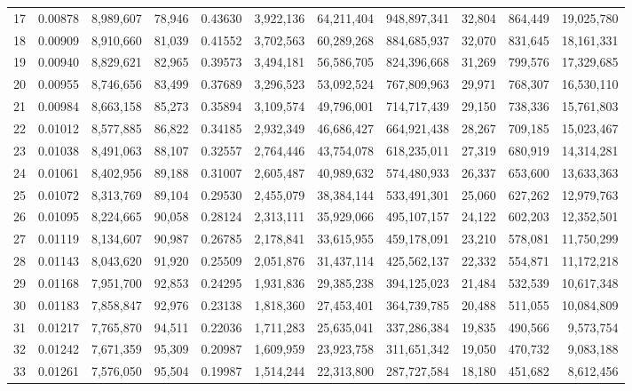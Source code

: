 \begin{landscape}
\begin{longtable}{rrrrrrrrrrr}
17 & 0.00878 & 8,989,607 & 78,946 & 0.43630 & 3,922,136 & 64,211,404 & 948,897,341 & 32,804 & 864,449 & 19,025,780 \\
18 & 0.00909 & 8,910,660 & 81,039 & 0.41552 & 3,702,563 & 60,289,268 & 884,685,937 & 32,070 & 831,645 & 18,161,331 \\
19 & 0.00940 & 8,829,621 & 82,965 & 0.39573 & 3,494,181 & 56,586,705 & 824,396,668 & 31,269 & 799,576 & 17,329,685 \\
20 & 0.00955 & 8,746,656 & 83,499 & 0.37689 & 3,296,523 & 53,092,524 & 767,809,963 & 29,971 & 768,307 & 16,530,110 \\
21 & 0.00984 & 8,663,158 & 85,273 & 0.35894 & 3,109,574 & 49,796,001 & 714,717,439 & 29,150 & 738,336 & 15,761,803 \\
22 & 0.01012 & 8,577,885 & 86,822 & 0.34185 & 2,932,349 & 46,686,427 & 664,921,438 & 28,267 & 709,185 & 15,023,467 \\
23 & 0.01038 & 8,491,063 & 88,107 & 0.32557 & 2,764,446 & 43,754,078 & 618,235,011 & 27,319 & 680,919 & 14,314,281 \\
24 & 0.01061 & 8,402,956 & 89,188 & 0.31007 & 2,605,487 & 40,989,632 & 574,480,933 & 26,337 & 653,600 & 13,633,363 \\
25 & 0.01072 & 8,313,769 & 89,104 & 0.29530 & 2,455,079 & 38,384,144 & 533,491,301 & 25,060 & 627,262 & 12,979,763 \\
26 & 0.01095 & 8,224,665 & 90,058 & 0.28124 & 2,313,111 & 35,929,066 & 495,107,157 & 24,122 & 602,203 & 12,352,501 \\
27 & 0.01119 & 8,134,607 & 90,987 & 0.26785 & 2,178,841 & 33,615,955 & 459,178,091 & 23,210 & 578,081 & 11,750,299 \\
28 & 0.01143 & 8,043,620 & 91,920 & 0.25509 & 2,051,876 & 31,437,114 & 425,562,137 & 22,332 & 554,871 & 11,172,218 \\
29 & 0.01168 & 7,951,700 & 92,853 & 0.24295 & 1,931,836 & 29,385,238 & 394,125,023 & 21,484 & 532,539 & 10,617,348 \\
30 & 0.01183 & 7,858,847 & 92,976 & 0.23138 & 1,818,360 & 27,453,401 & 364,739,785 & 20,488 & 511,055 & 10,084,809 \\
31 & 0.01217 & 7,765,870 & 94,511 & 0.22036 & 1,711,283 & 25,635,041 & 337,286,384 & 19,835 & 490,566 & 9,573,754 \\
32 & 0.01242 & 7,671,359 & 95,309 & 0.20987 & 1,609,959 & 23,923,758 & 311,651,342 & 19,050 & 470,732 & 9,083,188 \\
33 & 0.01261 & 7,576,050 & 95,504 & 0.19987 & 1,514,244 & 22,313,800 & 287,727,584 & 18,180 & 451,682 & 8,612,456 \\

\end{longtable}
\end{landscape}
